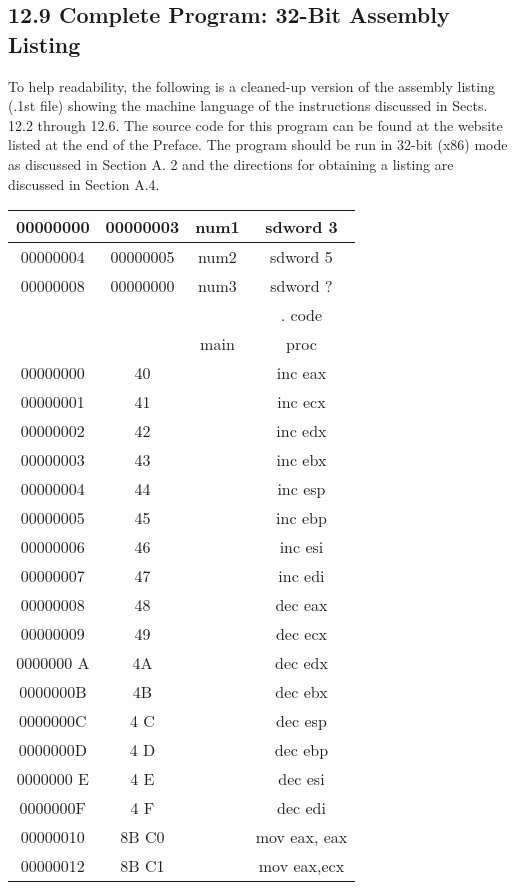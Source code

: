 \documentclass[10pt]{article}
\begin{document}
\subsection*{12.9 Complete Program: 32-Bit Assembly Listing}
To help readability, the following is a cleaned-up version of the assembly listing (.1st file) showing the machine language of the instructions discussed in Sects. 12.2 through 12.6. The source code for this program can be found at the website listed at the end of the Preface. The program should be run in 32-bit (x86) mode as discussed in Section A. 2 and the directions for obtaining a listing are discussed in Section A.4.

\begin{center}
\begin{tabular}{|c|c|c|c|}
\hline
00000000 & 00000003 & num1 & sdword 3 \\
\hline
00000004 & 00000005 & num2 & sdword 5 \\
\hline
00000008 & 00000000 & num3 & sdword ? \\
\hline
 &  &  & . code \\
\hline
 &  & main & proc \\
\hline
00000000 & 40 &  & inc eax \\
\hline
00000001 & 41 &  & inc ecx \\
\hline
00000002 & 42 &  & inc edx \\
\hline
00000003 & 43 &  & inc ebx \\
\hline
00000004 & 44 &  & inc esp \\
\hline
00000005 & 45 &  & inc ebp \\
\hline
00000006 & 46 &  & inc esi \\
\hline
00000007 & 47 &  & inc edi \\
\hline
00000008 & 48 &  & dec eax \\
\hline
00000009 & 49 &  & dec ecx \\
\hline
0000000 A & 4A &  & dec edx \\
\hline
0000000B & 4B &  & dec ebx \\
\hline
0000000C & 4 C &  & dec esp \\
\hline
0000000D & 4 D &  & dec ebp \\
\hline
0000000 E & 4 E &  & dec esi \\
\hline
0000000F & 4 F &  & dec edi \\
\hline
00000010 & 8B C0 &  & mov eax, eax \\
\hline
00000012 & 8B C1 &  & mov eax,ecx \\

\end{tabular}
\end{center}
\end{document}
